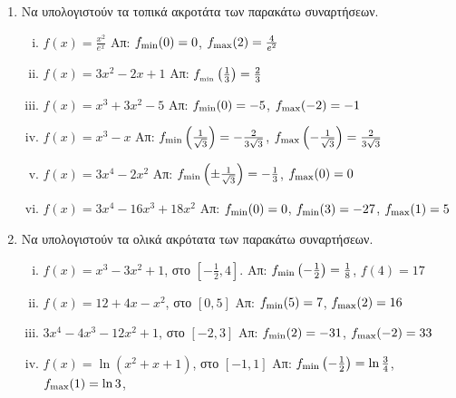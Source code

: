


\everymath{\displaystyle}



\begin{center}
\end{center}


\vspace{\baselineskip}

\begin{enumerate}
    \item Να υπολογιστούν τα τοπικά ακροτάτα των παρακάτω συναρτήσεων.

        \begin{enumerate}[i)]
        \renewcommand{\itemsep}{15pt}
            \item $ f(x) = \frac{x^{2}}{e^{x}} $
                 \hfill Απ: $ f_{\rm min}(0) = 0 $, $f_{\rm max}(2) = \frac{4}{e^{2}} $ 
            \item $ f(x) = 3x^{2}-2x+1 $ 
                \hfill Απ: $ f_{\rm_{min}}\left(\frac{1}{3} \right) = \frac{2}{3} $ 
            \item $ f(x) = x^{3}+3x^{2}-5 $ 
                \hfill Απ: $ f_{\rm min}(0) = -5 $, $ f_{\rm max}(-2) = -1 $ 
            \item $ f(x) = x^{3} - x $ 
                \hfill Απ: $ f_{\rm min}\left(\frac{1}{\sqrt{3}} \right) 
                = - \frac{2}{3 \sqrt{3}} $, $ f_{\rm max} \left(-\frac{1}{\sqrt{3}} 
                \right) = \frac{2}{3 \sqrt{3}} $
            \item $ f(x) = 3x^{4} - 2x^{2} $ 
                \hfill Απ: $ f_{\rm min}\left(\pm \frac{1}{\sqrt{3}}\right) 
                = - \frac{1}{3} $, $ f_{\rm max}(0) = 0 $
            \item $ f(x) = 3x^{4} -16x^{3}+18x^{2} $ 
                \hfill Απ: $ f_{\rm min}(0)=0 $, $ f_{\rm min}(3)
                =-27 $, $ f_{\rm max}(1) = 5 $ 
        \end{enumerate}

    \item Να υπολογιστούν τα ολικά ακρότατα των παρακάτω συναρτήσεων.
        \begin{enumerate}[i)]
        \renewcommand{\itemsep}{15pt}
            \item $ f(x) = x^{3} - 3x^{2} + 1 $, στο $ \left[- \frac{1}{2}, 4\right] $. 
                \hfill Απ: $ f_{\rm min}\left(- \frac{1}{2}\right) 
                = \frac{1}{8} $, $ f(4) = 17 $
            \item $ f(x) = 12 + 4x - x^{2} $, στο $ [0,5] $ 
                \hfill Απ: $ f_{\rm min}(5)=7 $, $ f_{\rm max}(2)=16 $ 
            \item $ 3x^{4}-4x^{3}-12x^{2} + 1 $, στο $ [-2,3] $ 
                \hfill Απ: $ f_{\rm min}(2)=-31 $, $ f_{\rm max}(-2)=33 $
            \item $ f(x)= \ln{(x^{2}+x+1)} $, στο $ [-1,1] $ 
                \hfill Απ: $ f_{\rm min}\left(-\frac{1}{2}\right)
                = \ln{ \frac{3}{4} }$, $ f_{\rm max}(1)= \ln{3} $,  

        \end{enumerate}
\end{enumerate}




